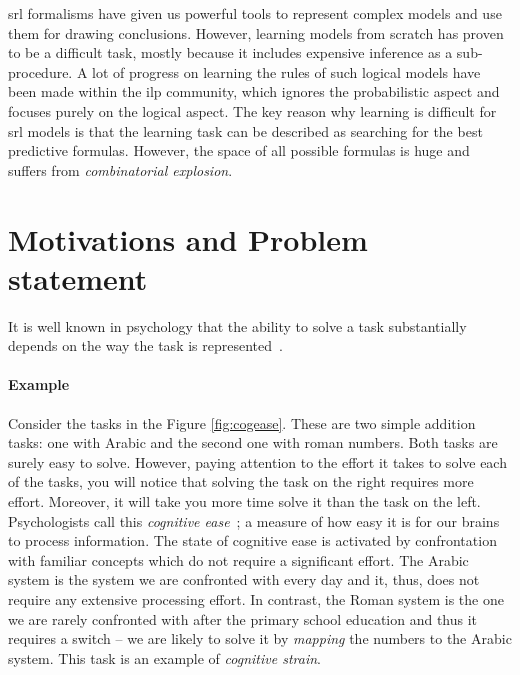 \gls{srl} formalisms have given us powerful tools to represent complex models and use them for drawing conclusions.
However, learning models from scratch has proven to be a difficult task, mostly because it includes expensive inference as a sub-procedure.
A lot of progress on learning the rules of such logical models have been made within the \gls{ilp} community, which ignores the probabilistic aspect and focuses purely on the logical aspect.
The key reason why learning is difficult for \gls{srl} models is that the learning task can be described as searching for the best predictive formulas.
However, the space of all possible formulas is huge and suffers from \textit{combinatorial explosion}.










\section{Motivations and Problem statement}

It is well known in psychology that the ability to solve a task substantially depends on the way the task is represented~\cite{kahneman2011thinking}.




\paragraph{Example} Consider the tasks in the Figure \ref{fig:cogease}.
These are two simple addition tasks: one with Arabic and the second one with roman numbers.
Both tasks are surely easy to solve.
However, paying attention to the effort it takes to solve each of the tasks, you will notice that solving the task on the right requires more effort.
Moreover, it will take you more time solve it than the task on the left.
Psychologists call this \textit{cognitive ease}~\cite{kahneman2011thinking}; a measure of how easy it is for our brains to process information.
The state of cognitive ease is activated by confrontation with familiar concepts which do not require a significant effort.
The Arabic system is the system we are confronted with every day and it, thus, does not require any extensive processing effort.
In contrast, the Roman system is the one we are rarely confronted with after the primary school education and thus it requires a switch -- we are likely to solve it by \textit{mapping} the numbers to the Arabic system.
This task is an example of \textit{cognitive strain}.


